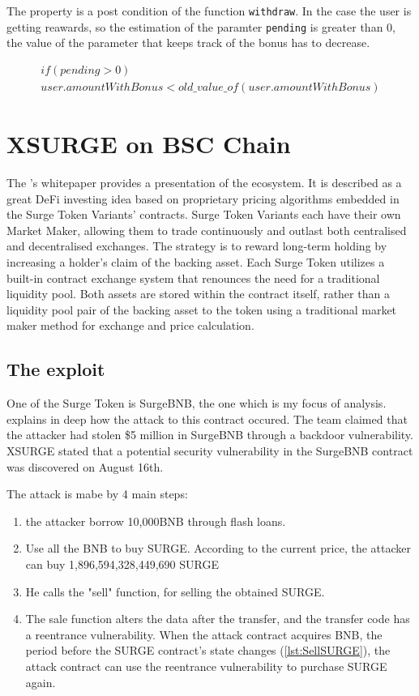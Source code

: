 The property is a post condition of the function \texttt{withdraw}. 
In the case the user is getting reawards, so the estimation of the paramter \texttt{pending} is greater than 0, the value of the parameter that keeps track of the bonus has to decrease.

\begin{equation}
    \begin{split}
        if (pending>0)
        \\ user.amountWithBonus < old\_value\_of(user.amountWithBonus)
    \end{split}
\end{equation}

\section{XSURGE on BSC Chain}   
\label{sec:Exploits:XSURGE}
The \citet{XSurgeWeb}'s whitepaper provides a presentation of the ecosystem.
It is described as a great DeFi investing idea based on proprietary pricing algorithms embedded in the Surge Token Variants' contracts.
Surge Token Variants each have their own Market Maker, allowing them to trade continuously and outlast both 
centralised and decentralised exchanges. 
The strategy is to reward long-term holding by increasing a
holder's claim of the backing asset. Each Surge Token utilizes a built-in contract exchange system that renounces the need for
a traditional liquidity pool. Both assets are stored within the contract itself, 
rather than a liquidity pool pair of the backing asset to the
token using a traditional market maker method for exchange and price calculation.

\subsection{The exploit}
One of the Surge Token is SurgeBNB, the one which is my focus of analysis.
\citet{XSurgeBNB} explains in deep how the attack to this contract occured. 
The team claimed that the attacker had stolen \$5 million in SurgeBNB through a backdoor vulnerability.
XSURGE stated that a potential security vulnerability in the SurgeBNB contract was discovered on August 16th.

The attack is mabe by 4 main steps:
\begin{enumerate}
    \item the attacker borrow  10,000BNB through flash loans.
    \item Use all the BNB to buy SURGE. According to the current price, 
    the attacker can buy 1,896,594,328,449,690 SURGE
    \item He calls the "sell" function, for selling the obtained SURGE.
    \item The sale function alters the data after the transfer, and the transfer code has a reentrance vulnerability.
    When the attack contract acquires BNB, the period before the SURGE contract's state changes 
    (\autoref{lst:SellSURGE}), the attack contract can use the reentrance 
    vulnerability to purchase SURGE again.
\end{enumerate}

